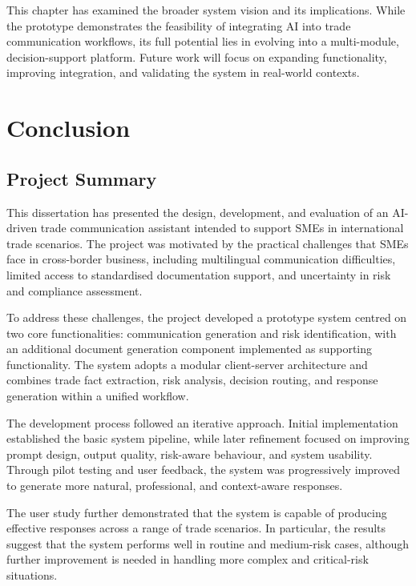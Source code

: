 \documentclass[12pt,a4paper]{report}
\begin{document}
This chapter has examined the broader system vision and its implications. While the prototype demonstrates the feasibility of integrating AI into trade communication workflows, its full potential lies in evolving into a multi-module, decision-support platform. Future work will focus on expanding functionality, improving integration, and validating the system in real-world contexts.

\chapter{Conclusion}

\section{Project Summary}

This dissertation has presented the design, development, and evaluation of an AI-driven trade communication assistant intended to support SMEs in international trade scenarios. The project was motivated by the practical challenges that SMEs face in cross-border business, including multilingual communication difficulties, limited access to standardised documentation support, and uncertainty in risk and compliance assessment.

To address these challenges, the project developed a prototype system centred on two core functionalities: communication generation and risk identification, with an additional document generation component implemented as supporting functionality. The system adopts a modular client-server architecture and combines trade fact extraction, risk analysis, decision routing, and response generation within a unified workflow.

The development process followed an iterative approach. Initial implementation established the basic system pipeline, while later refinement focused on improving prompt design, output quality, risk-aware behaviour, and system usability. Through pilot testing and user feedback, the system was progressively improved to generate more natural, professional, and context-aware responses.

The user study further demonstrated that the system is capable of producing effective responses across a range of trade scenarios. In particular, the results suggest that the system performs well in routine and medium-risk cases, although further improvement is needed in handling more complex and critical-risk situations.
\end{document}
